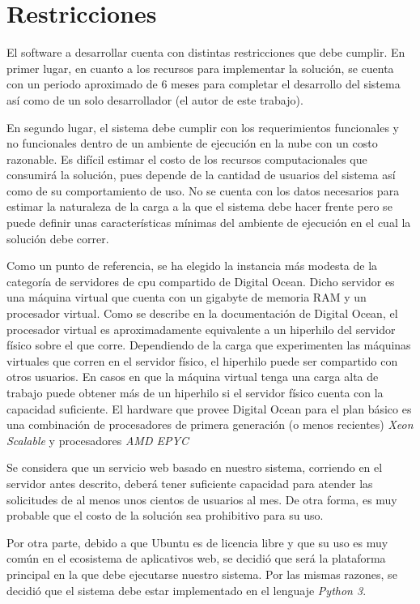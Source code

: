\section{Restricciones}

El software a desarrollar cuenta con distintas restricciones que debe cumplir.
En primer lugar, en cuanto a los recursos para implementar la solución, se
cuenta con un periodo aproximado de 6 meses para completar el desarrollo del
sistema así como de un solo desarrollador (el autor de este trabajo).

En segundo lugar, el sistema debe cumplir con los requerimientos funcionales y
no funcionales dentro de un ambiente de ejecución en la nube con un costo
razonable. Es difícil estimar el costo de los recursos computacionales que
consumirá la solución, pues depende de la cantidad de usuarios del sistema así
como de su comportamiento de uso. No se cuenta con los datos necesarios para
estimar la naturaleza de la carga a la que el sistema debe hacer frente pero se
puede definir unas características mínimas del ambiente de ejecución en el cual
la solución debe correr.

Como un punto de referencia, se ha elegido la instancia más modesta de la
categoría de servidores de cpu compartido de Digital Ocean. Dicho servidor es
una máquina virtual que cuenta con un gigabyte de memoria RAM y un procesador
virtual. Como se describe en la documentación de Digital Ocean, el procesador
virtual es aproximadamente equivalente a un hiperhilo del servidor físico sobre
el que corre. Dependiendo de la carga que experimenten las máquinas virtuales
que corren en el servidor físico, el hiperhilo puede ser compartido con otros
usuarios. En casos en que la máquina virtual tenga una carga alta de trabajo
puede obtener más de un hiperhilo si el servidor físico cuenta con la capacidad
suficiente. El hardware que provee Digital Ocean para el plan básico es una
combinación de procesadores de primera generación (o menos recientes)
\textit{Xeon Scalable} y procesadores \textit{AMD EPYC}

Se considera que un servicio web basado en nuestro sistema, corriendo en el
servidor antes descrito, deberá tener suficiente capacidad para atender las
solicitudes de al menos unos cientos de usuarios al mes. De otra forma, es muy
probable que el costo de la solución sea prohibitivo para su uso.

Por otra parte, debido a que Ubuntu es de licencia libre y que su uso es muy
común en el ecosistema de aplicativos web, se decidió que será la plataforma
principal en la que debe ejecutarse nuestro sistema. Por las mismas razones, se
decidió que el sistema debe estar implementado en el lenguaje \textit{Python 3}.


